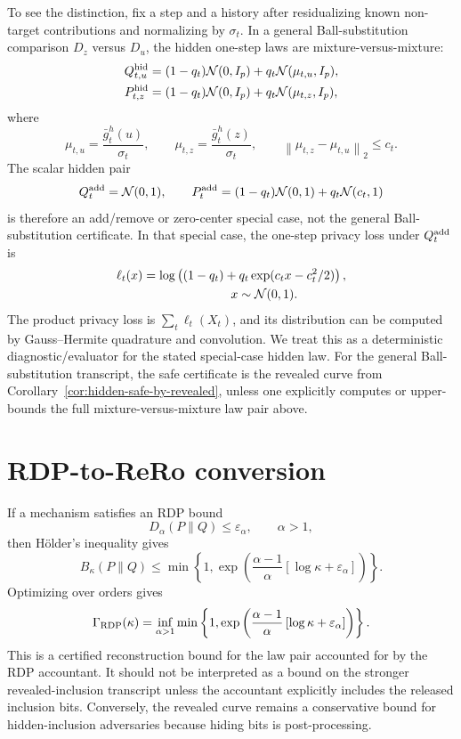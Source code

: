 \documentclass[conference,compsoc]{IEEEtran}
\newcommand{\N}{\mathcal{N}}
\newcommand{\norm}[1]{\left\lVert #1\right\rVert}
\begin{document}
To see the distinction, fix a step and a history after residualizing known
non-target contributions and normalizing by $\sigma_t$.  In a general
Ball-substitution comparison $D_z$ versus $D_u$, the hidden one-step laws are
mixture-versus-mixture:
\begin{align*}
Q_{t,u}^{\rm hid}
&=(1-q_t)\N(0,I_p)+q_t\N(\mu_{t,u},I_p),\\
P_{t,z}^{\rm hid}
&=(1-q_t)\N(0,I_p)+q_t\N(\mu_{t,z},I_p),
\end{align*}
where
\[
\mu_{t,u}=\frac{\bar g_t^h(u)}{\sigma_t},
\qquad
\mu_{t,z}=\frac{\bar g_t^h(z)}{\sigma_t},
\qquad
\norm{\mu_{t,z}-\mu_{t,u}}_2\le c_t.
\]
The scalar hidden pair
\[
Q_t^{\rm add}=\N(0,1),
\qquad
P_t^{\rm add}=(1-q_t)\N(0,1)+q_t\N(c_t,1)
\]
is therefore an add/remove or zero-center special case, not the general
Ball-substitution certificate.  In that special case, the one-step privacy loss
under $Q_t^{\rm add}$ is
\begin{align*}
\ell_t(x)
&=
\log\left((1-q_t)+q_t\exp(c_tx-c_t^2/2)\right),\\
&\hspace{25mm} x\sim\N(0,1).
\end{align*}
The product privacy loss is $\sum_t\ell_t(X_t)$, and its distribution can be
computed by Gauss--Hermite quadrature and convolution.  We treat this as a
deterministic diagnostic/evaluator for the stated special-case hidden law.  For
the general Ball-substitution transcript, the safe certificate is the revealed
curve from Corollary~\ref{cor:hidden-safe-by-revealed}, unless one explicitly
computes or upper-bounds the full mixture-versus-mixture law pair above.

\section{RDP-to-ReRo conversion}
\label{sec:rdp-conversion}

If a mechanism satisfies an RDP bound
\[
D_\alpha(P\|Q)\le\varepsilon_\alpha,
\qquad \alpha>1,
\]
then H\"older's inequality gives
\[
B_\kappa(P\|Q)
\le
\min\left\{1,
\exp\left(
\frac{\alpha-1}{\alpha}
\left[\log\kappa+\varepsilon_\alpha\right]
\right)\right\}.
\]
Optimizing over orders gives
\[
\Gamma_{\rm RDP}(\kappa)
=
\inf_{\alpha>1}
\min\left\{1,
\exp\left(
\frac{\alpha-1}{\alpha}
\left[\log\kappa+\varepsilon_\alpha\right]
\right)\right\}.
\]
This is a certified reconstruction bound for the law pair accounted for by the
RDP accountant.  It should not be interpreted as a bound on the stronger
revealed-inclusion transcript unless the accountant explicitly includes the
released inclusion bits.  Conversely, the revealed curve remains a conservative
bound for hidden-inclusion adversaries because hiding bits is post-processing.
\end{document}
